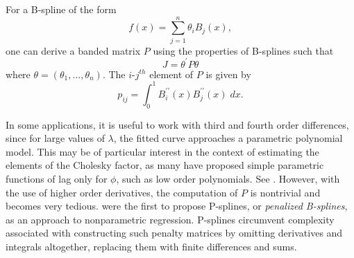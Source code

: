 \documentclass[12pt]{article}
\theoremstyle{definition}
\begin{document}
For a B-spline of the form
\[
f\left(x\right) = \sum\limits_{j=1}^n \theta_i B_j\left(x\right),
\]
one can derive a banded matrix $P$ using the properties of B-splines such that 
 \[
 J = \theta^\prime P \theta
 \] 
 \noindent
 where $\theta = \left(\theta_1,\dots, \theta_n\right)$. The $i$-$j^{th}$ element of $P$ is given by
 \[
 p_{ij} = \int_0^1 B_i^{\prime \prime} \left( x \right)B_j^{\prime \prime} \left( x \right)\;dx.
 \]


%
%

In some applications, it is useful to work with third and fourth order differences, since for large values of $\lambda$, the fitted curve approaches a parametric polynomial model. This may be of particular interest in the context of estimating the elements of the Cholesky factor, as many have proposed simple parametric functions of lag only for $\phi$, such as low order polynomials. See \citet{pourahmadi1999joint}. However, with the use of higher order derivatives, the computation of $P$ is nontrivial and becomes very tedious. \citet{eilers1996flexible} were the first to propose P-splines, or \emph{penalized B-splines}, as an approach to nonparametric regression. P-splines circumvent complexity associated with constructing such penalty matrices by omitting derivatives and integrals altogether, replacing them with finite differences and sums. 
\end{document}
